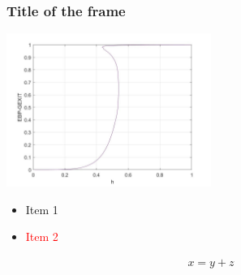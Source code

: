 \documentclass{beamer}
\begin{document}
\begin{frame}
\frametitle{Title of the frame}

\includegraphics[width=0.5\textwidth]{Sample_figure.jpg}

\begin{itemize}
% 
\item Item 1
% 
\pause
% 
\item \textcolor{red}{Item 2}
%  
\end{itemize}

\begin{align}
%  
x = y + z
% 
\end{align}


 
\end{frame}
\end{document}
